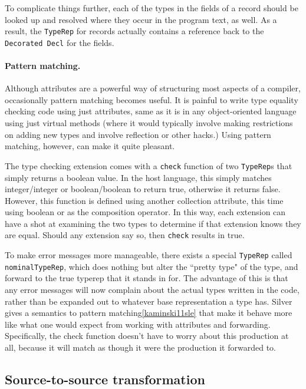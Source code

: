 To complicate things further, each of the types in the fields of a record should be
looked up and resolved where they occur in the program text, as well.
%
As a result, the \texttt{TypeRep} for records actually contains a reference
back to the \texttt{Decorated Decl} for the fields.


\paragraph{Pattern matching.}
Although attributes are a powerful way of structuring most aspects of a compiler,
occasionally pattern matching becomes useful.
%
It is painful to write type equality checking code using just attributes,
same as it is in any object-oriented language using just virtual methods
(where it would typically involve making restrictions on adding new types
and involve reflection or other hacks.)
%
Using pattern matching, however, can make it quite pleasant.

The type checking extension comes with a \texttt{check} function of two
\texttt{TypeRep}s that simply returns a boolean value.
%
In the host language, this simply matches integer/integer or boolean/boolean
to return true, otherwise it returns false.
%
However, this function is defined using another collection attribute,
this time using boolean or as the composition operator.
%
In this way, each extension can have a shot at examining the two types to
determine if that extension knows they are equal.
%
Should any extension say so, then \texttt{check} results in true.

To make error messages more manageable, there exists a special \texttt{TypeRep}
called \texttt{nominalTypeRep}, which does nothing but alter the ``pretty type"
of the type, and forward to the true typerep that it stands in for.
%
The advantage of this is that any error messages will now complain about the
actual types written in the code, rather than be expanded out to whatever
base representation a type has.
%
Silver gives a semantics to pattern matching\ref{kaminski11sle} that make it
behave more like what one would expect from working with attributes and
forwarding.
%
Specifically, the check function doesn't have to worry about this
production at all, because it will match as though it were the production
it forwarded to.

\subsection{Source-to-source transformation}
\label{silver:sec:transformation}

